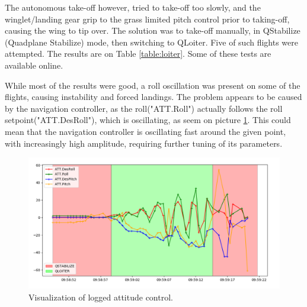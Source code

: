 The autonomous take-off however, tried to take-off too slowly, and the winglet/landing gear grip to the grass limited pitch control prior to taking-off, causing the wing to tip over. The solution was to take-off manually, in QStabilize (Quadplane Stabilize) mode, then switching to QLoiter. Five of such flights were attempted. The results are on Table \ref{table:loiter}.
Some of these tests are available online\cite{test2}.

While most of the results were good, a roll oscillation was present on some of the flights, causing instability and forced landings.
The problem appears to be caused by the navigation controller, as the roll("ATT.Roll") actually follows the roll setpoint("ATT.DesRoll"), which is oscillating, as seem on picture \ref{fig:rollOscillation}. This could mean that the navigation controller is oscillating fast around the given point, with increasingly high amplitude, requiring further tuning of its parameters. 

	\begin{figure}
\centering
  \includegraphics[width=0.9\linewidth]{figs/rolloscillation.png}
  \caption{Visualization of logged attitude control.}
  \label{fig:rollOscillation}
\end{figure}
	


